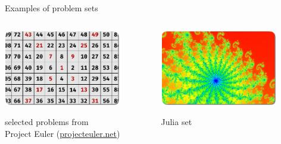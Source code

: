 \documentclass[svgnames]{beamer}
\begin{document}
\begin{frame}{Examples of problem sets}

 \vspace{-0.7truecm}
 \begin{columns}[t]
  \begin{column}{0.5\textwidth}
   \begin{center}
    \includegraphics[width=0.8\textwidth]{spiral}

    selected problems from\\[-0.05truecm] Project Euler (\url{projecteuler.net})
   \end{center}
  \end{column}%
  \begin{column}{0.5\textwidth}
   \begin{center}
    \includegraphics[width=0.8\textwidth]{julia}

    Julia set
   \end{center}
  \end{column}%
 \end{columns}


\end{frame}
\end{document}

